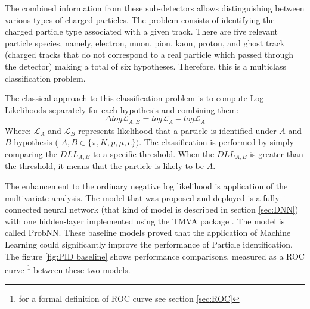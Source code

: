 The combined information from these sub-detectors allows distinguishing between various types of charged particles. The problem consists of identifying the charged particle type associated with a given track. There are five relevant particle species, namely, electron, muon, pion, kaon, proton, and ghost track (charged tracks that do not correspond to a real particle which passed through the detector) making a total of six hypotheses. Therefore, this is a multiclass classification problem. 

The classical approach to this classification problem is to compute Log Likelihoods separately for each hypothesis and combining them: 
\begin{equation}
\Delta log \mathcal{L}_{A,B} = log \mathcal{L}_{A} - log \mathcal{L}_{A}  
\end{equation}
Where: $ \mathcal{L}_{A}$ and $ \mathcal{L}_{B}$ represents likelihood that a particle is identified under $A$ and $B$ hypothesis ( $A, B  \in \{ \pi, K, p, \mu, e \})$. The classification is performed by simply comparing the $DLL_{A,B}$ to a specific threshold. When the $DLL_{A,B}$ is greater than the threshold, it means that the particle is likely to be $A$. 

The enhancement to the ordinary negative log likelihood is application of the multivariate analysis. The model that was proposed and deployed is a fully-connected neural network (that kind of model is described in section \ref{sec:DNN}) with one hidden-layer implemented using the TMVA package \cite{TMVA}. The model is called ProbNN. These baseline models proved that the application of Machine Learning could significantly improve the performance of Particle identification. The figure \ref{fig:PID baseline} shows performance comparisons, measured as a ROC curve \footnote{for a formal definition of ROC curve see section \ref{sec:ROC}} between these two models.

